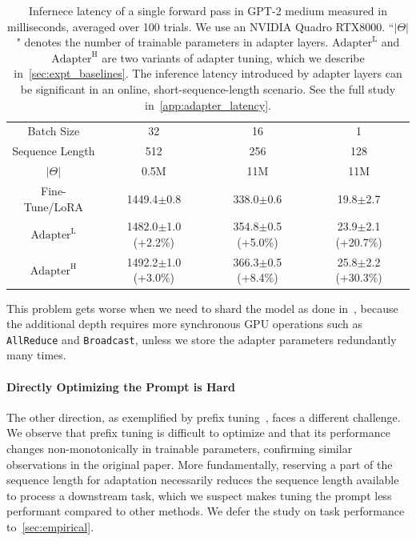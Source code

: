 \documentclass{article} %
\begin{document}
\begin{table}[h]
  \centering
  \begin{tabular}{c|ccc}
  \hline
  \toprule
  
  Batch Size              &  32                 & 16        & 1    \\
  Sequence Length         &  512                & 256       & 128  \\
  $|\Theta|$              &  0.5M         & 11M & 11M     \\
  \midrule
  Fine-Tune/LoRA               & 1449.4$\pm$0.8           & 338.0$\pm$0.6  & 19.8$\pm$2.7 \\
  \midrule
  $\text{Adapter}^{\text{L}}$   & 1482.0$\pm$1.0 (\textcolor{myred1}{+2.2\%})  & 354.8$\pm$0.5 (\textcolor{myred2}{+5.0\%})  & 23.9$\pm$2.1 (\textcolor{myred3}{+20.7\%}) \\
  $\text{Adapter}^{\text{H}}$   & 1492.2$\pm$1.0 (\textcolor{myred1}{+3.0\%})  & 366.3$\pm$0.5 (\textcolor{myred2}{+8.4\%})  & 25.8$\pm$2.2 (\textcolor{myred3}{+30.3\%}) \\
  \bottomrule
  \end{tabular}
  \caption{Infernece latency of a single forward pass in GPT-2 medium measured in milliseconds, averaged over 100 trials. We use an NVIDIA Quadro RTX8000. ``$|\Theta|$" denotes the number of trainable parameters in adapter layers. $\text{Adapter}^{\text{L}}$ and $\text{Adapter}^{\text{H}}$ are two variants of adapter tuning, which we describe in~\autoref{sec:expt_baselines}. The inference latency introduced by adapter layers can be significant in an online, short-sequence-length scenario. See the full study in~\autoref{app:adapter_latency}.}
  \label{tab:adapter_slow}
\end{table}

This problem gets worse when we need to shard the model as done in~\citet{shoeybi2020megatronlm, lepikhin2020gshard}, because the additional depth requires more synchronous GPU operations such as \texttt{AllReduce} and \texttt{Broadcast}, unless we store the adapter parameters redundantly many times.

\paragraph{Directly Optimizing the Prompt is Hard}
The other direction, as exemplified by prefix tuning~\citep{li_prefix-tuning_2021}, faces a different challenge.
We observe that prefix tuning is difficult to optimize and that its performance changes non-monotonically in trainable parameters, confirming similar observations in the original paper.
More fundamentally, reserving a part of the sequence length for adaptation necessarily reduces the sequence length available to process a downstream task, which we suspect makes tuning the prompt less performant compared to other methods.
We defer the study on task performance to~\autoref{sec:empirical}.
\end{document}
